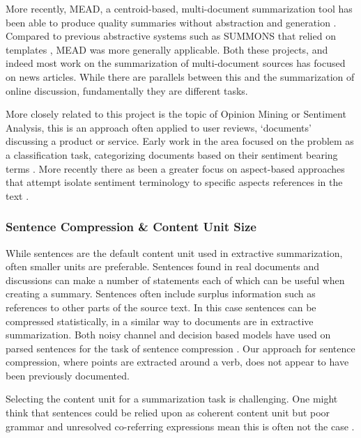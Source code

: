         More recently, MEAD, a centroid-based, multi-document summarization tool has been able to produce quality summaries without abstraction and generation \cite{radev2000centroid}. Compared to previous abstractive systems such as SUMMONS that relied on templates \cite{mckeown1995generating}, MEAD was more generally applicable. Both these projects, and indeed most work on the summarization of multi-document sources has focused on news articles. While there are parallels between this and the summarization of online discussion, fundamentally they are different tasks.

        More closely related to this project is the topic of Opinion Mining or Sentiment Analysis, this is an approach often applied to user reviews, `documents' discussing a product or service. Early work in the area focused on the problem as a classification task, categorizing documents based on their sentiment bearing terms \cite{turney2002thumbs}. More recently there as been a greater focus on aspect-based approaches that attempt isolate sentiment terminology to specific aspects references in the text \cite{hu2004mining}.

      \subsubsection{Sentence Compression \& Content Unit Size}
        While sentences are the default content unit used in extractive summarization, often smaller units are preferable. Sentences found in real documents and discussions can make a number of statements each of which can be useful when creating a summary. Sentences often include surplus information such as references to other parts of the source text. In this case sentences can be compressed statistically, in a similar way to documents are in extractive summarization. Both noisy channel and decision based models have used on parsed sentences for the task of sentence compression \cite{knight2000statistics}. Our approach for sentence compression, where points are extracted around a verb, does not appear to have been previously documented.

        Selecting the content unit for a summarization task is challenging. One might think that sentences could be relied upon as coherent content unit but poor grammar and unresolved co-referring expressions mean this is often not the case \cite{witbrock1999ultra}.


